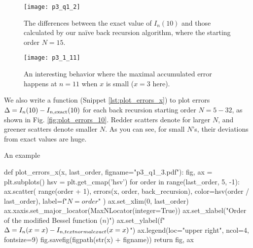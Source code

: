\begin{figure}[H] %
    \centering
    \begin{minipage}[t]{0.45\linewidth}
        \centering
        \texttt{[image: p3\_q1\_2]}
        \caption{The differences between the exact value of $I_n(10)$ and those calculated by
            our naïve back recursion algorithm, where the starting order $N = 15$.}
        \label{fig:I_n_10}
    \end{minipage}
    \hfil
    \begin{minipage}[t]{0.45\linewidth}
        \centering
        \texttt{[image: p3\_1\_11]}
        \caption{An interesting behavior where the maximal accumulated error happens at
            $n = 11$ when $x$ is small ($x = 3$ here).}
        \label{fig:I_n_3}
    \end{minipage}
\end{figure}

We also write a function  (Snippet \ref{lst:plot_errors_x}) to
plot errors $\Delta = I_n(10) - I_{n,\textnormal{exact}}(10)$ for each
back recursion starting order $N = 5 - 32$, as shown in Fig. \ref{fig:plot_errors_10}.
Redder scatters denote for larger $N$, and greener scatters denote
smaller $N$. As you can see, for small $N$'s, their deviations from exact values are huge.

\begin{algorithm}
    \caption{An example}
    \label{lst:plot_errors_x}
    \begin{pythoncode}
        def plot_errors_x(x, last_order, figname="p3_q1_3.pdf"):
            fig, ax = plt.subplots()
            hsv = plt.get_cmap('hsv')
            for order in range(last_order, 5, -1):
                ax.scatter(
                    range(order + 1), errors(x, order, back_recursion),
                    color=hsv(order / last_order),
                    label=f"$N={order}$"
                )
            ax.set_xlim(0, last_order)
            ax.xaxis.set_major_locator(MaxNLocator(integer=True))
            ax.set_xlabel("Order of the modified Bessel function ($n$)")
            ax.set_ylabel(f"$\Delta = I_{{n}}(x={x}) - I_{{n,\\textnormal{{exact}}}}(x={x})$")
            ax.legend(loc="upper right", ncol=4, fontsize=9)
            fig.savefig(figpath(str(x) + figname))
            return fig, ax
        \end{pythoncode}
\end{algorithm}

